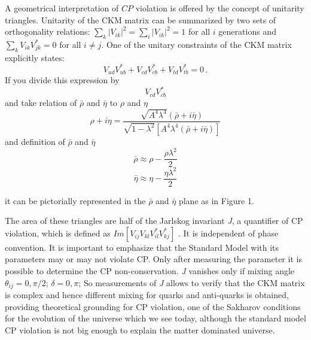 \indent A geometrical interpretation of $CP$ violation is offered by the concept of unitarity triangles. Unitarity of the CKM matrix can be summarized by two sets of orthogonality relations:
$\sum_{k} |V_{ik}|^2 = \sum_{i} |V_{ik}|^2 = 1$ for all $i$ generations and $\sum_k V_{ik}V^*_{jk} = 0$ for all $i\neq j$. One of the unitary constraints of the CKM matrix explicitly states:
\begin{equation}
  V_{ud}V^*_{ub} + V_{cd}V^*_{cb} + V_{td}V^*_{tb} = 0 \, .
\end{equation}
If you divide this expression by 
\begin{equation}
V_{cd}V^*_{cb}
\end{equation}
and take relation\cite{Buras} of $\bar{\rho}$ and $\bar{\eta}$ to ${\rho}$ and ${\eta}$ 
\begin{equation}
   {\rho} + i {\eta} = \frac{\sqrt{A^{4}\lambda^{4}}(\bar{\rho} + i \bar{\eta})}{\sqrt{1-\lambda^2}[A^{4}\lambda^{4}(\bar{\rho} + i \bar{\eta})]}
\end{equation}
and definition of $\bar{\rho}$ and $\bar{\eta}$
\begin{equation}
\bar{\rho} \approx \rho - \frac{\rho\lambda^{2}}{2}
\end{equation}
\begin{equation}
\bar{\eta} \approx \eta - \frac{\eta\lambda^{2}}{2}
\end{equation}

  it can be pictorially represented \cite{ewconstraint} in the $\bar{\rho}$ and $\bar{\eta}$ plane as in Figure 1.

The area of these triangles are half of the Jarlskog invariant \textit{J}, a quantifier of CP violation, which is defined as $ Im[V_{ij}V_{kl}V^*_{il}V^*_{kj}]$ \cite{jarsklog}. It is independent of phase convention. It is important to emphasize that the Standard Model with its parameters may or may not violate CP. Only after measuring the parameter it is possible to determine the CP non-conservation. \textit{J} vanishes\cite{secondjar} only if mixing angle $\theta_{ij} = 0 , \pi/2$; $\delta =  0 , \pi$; So measurements of \textit{J} allows to verify that the CKM matrix is complex and hence different mixing for quarks and anti-quarks is obtained, providing theoretical grounding for CP violation, one of the Sakharov conditions for the evolution of the universe which we see today, although the standard model CP violation is not big enough to explain the matter dominated universe.

